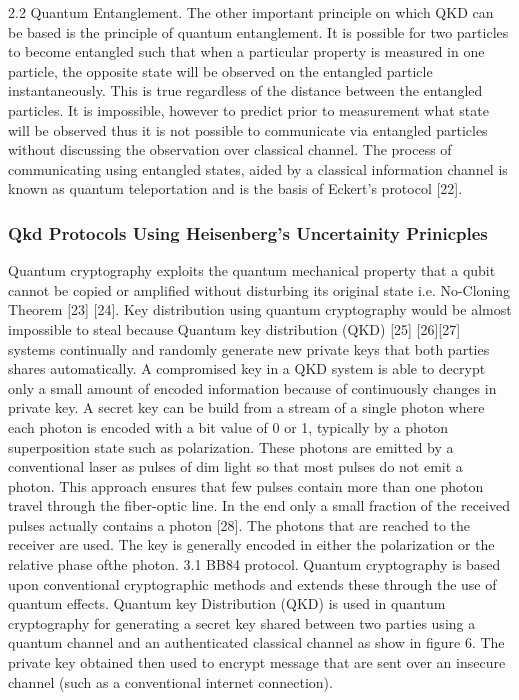 2.2 Quantum Entanglement. The other important principle on which QKD can be based is the principle of quantum entanglement. It is possible for two particles to become entangled such that when a particular property is measured in one particle, the opposite state will be observed on the entangled particle instantaneously. This is true regardless of the distance between the entangled particles. It is impossible, however to predict prior to measurement what state will be observed thus it is not possible to communicate via entangled particles without discussing the observation over classical channel. The process of communicating using entangled states, aided by a classical information channel is known as quantum teleportation and is the basis of Eckert's protocol [22].

\subsubsection{Qkd Protocols Using Heisenberg’s Uncertainity Prinicples}
Quantum cryptography exploits the quantum mechanical property that a qubit cannot be copied or amplified without disturbing its original state i.e. No-Cloning Theorem [23] [24]. Key distribution using quantum cryptography would be almost impossible to steal because Quantum key distribution (QKD) [25] [26][27] systems continually and randomly generate new private keys that both parties shares automatically. A compromised key in a QKD system is able to decrypt only a small amount of encoded information because of continuously changes in private key. A secret key can be build from a stream of a single photon where each photon is encoded with a bit value of 0 or 1, typically by a photon superposition state such as polarization. These photons are emitted by a conventional laser as pulses of dim light so that most pulses do not emit a photon. This approach ensures that few pulses contain more than one photon travel through the fiber-optic line. In the end only a small fraction of the received pulses actually contains a photon [28]. The photons that are reached to the receiver are used. The key is generally encoded in either the polarization or the relative phase ofthe photon.
3.1 BB84 protocol. Quantum cryptography is based upon conventional cryptographic methods and extends these through the use of quantum effects. Quantum key Distribution (QKD) is used in quantum cryptography for generating a secret key shared between two parties using a quantum channel and an authenticated classical channel as show in figure 6. The private key obtained then used to encrypt message that are sent over an insecure channel (such as a conventional internet connection).

